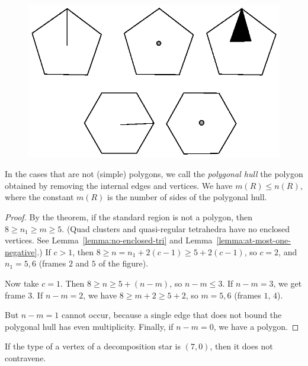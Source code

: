 \begin{figure}[htb]
  \centering
  \includegraphics{PS/diag71.ps}
  \caption{}
  \label{fig:std-aggregates}
\end{figure}


In the cases that are not (simple) polygons, we call the {\it polygonal
hull\/} the polygon obtained by removing the internal edges and
vertices. We have $m(R)\le n(R)$, where the constant $m(R)$ is the
number of sides of the polygonal hull.

\begin{proof}
By the theorem, if the standard region is not a polygon, then $8\ge
n_1\ge m\ge 5$. (Quad clusters and quasi-regular tetrahedra have no
enclosed vertices. See Lemma~\ref{lemma:no-enclosed-tri} and
Lemma~\ref{lemma:at-most-one-negative}.) If $c>1$, then $8\ge
n=n_1+2(c-1)\ge 5+2(c-1)$, so $c=2$, and $n_1=5,6$ (frames $2$ and $5$
of the figure).

Now take $c=1$.    Then $8\ge n\ge 5+(n-m)$, so $n-m\le 3$.  If $n-m=3$,
we get frame $3$. If $n-m=2$, we have $8\ge m+2\ge 5+2$, so $m=5,6$
(frames $1$, $4$).

But $n-m=1$ cannot occur, because a single edge that does not bound the
polygonal hull has even multiplicity.  Finally, if $n-m=0$, we have a
polygon.
\end{proof}

\begin{corollary} \label{lemma:70}
If the type of a vertex of a decomposition star is $(7,0)$, then
it does not contravene.
\end{corollary}

